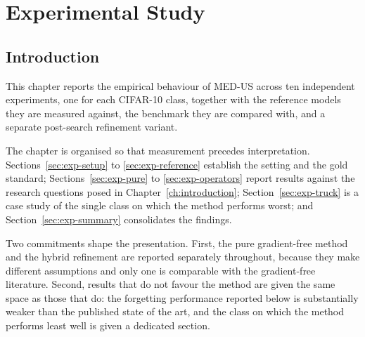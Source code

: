 %
%

\chapter{Experimental Study}
\label{ch:experimental-study}

\section{Introduction}
\label{sec:exp-intro}

This chapter reports the empirical behaviour of MED-US across ten independent
experiments, one for each CIFAR-10 class, together with the reference models they
are measured against, the benchmark they are compared with, and a separate
post-search refinement variant.

The chapter is organised so that measurement precedes interpretation.
Sections~\ref{sec:exp-setup} to \ref{sec:exp-reference} establish the setting and
the gold standard; Sections~\ref{sec:exp-pure} to \ref{sec:exp-operators} report
results against the research questions posed in Chapter~\ref{ch:introduction};
Section~\ref{sec:exp-truck} is a case study of the single class on which the
method performs worst; and Section~\ref{sec:exp-summary} consolidates the
findings.

Two commitments shape the presentation. First, the pure gradient-free method and
the hybrid refinement are reported separately throughout, because they make
different assumptions and only one is comparable with the gradient-free
literature. Second, results that do not favour the method are given the same
space as those that do: the forgetting performance reported below is substantially
weaker than the published state of the art, and the class on which the method
performs least well is given a dedicated section.

